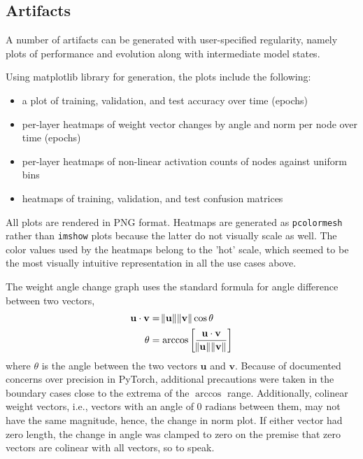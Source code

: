\documentclass[10pt,epsf]{article}
\newcommand{\mxn}[1]{\mathbf{#1}}
\begin{document}
{  \subsection{Artifacts}{
    A number of artifacts can be generated with user-specified regularity, namely plots of performance
    and evolution along with intermediate model states.

    Using matplotlib\autocite{mplpplot} library for generation, the plots include the following:
    \begin{itemize}
    \item{a plot of training, validation, and test accuracy over time (epochs)}
    \item{per-layer heatmaps of weight vector changes by angle and norm per node over time (epochs)}
    \item{per-layer heatmaps of non-linear activation counts of nodes against uniform bins}
    \item{heatmaps of training, validation, and test confusion matrices}
    \end{itemize}

    All plots are rendered in PNG format. Heatmaps are generated as \texttt{pcolormesh}\autocite{mplppcolormesh}
    rather than \texttt{imshow}\autocite{mplpimshow} plots because the latter do not visually scale as well.
    The color values used by the heatmaps belong to the 'hot' scale\autocite{mplpcolorbar}, which seemed to be the most visually intuitive representation in all the use cases above.

    The weight angle change graph uses the standard formula for angle difference between two vectors\autocite[335]{Lay},
    \begin{align*}
      \mxn{u} \cdot \mxn{v} &= \norm{\mxn{u}} \norm{\mxn{v}} \cos \theta \\
      \theta &= \arccos \bigg[ \frac{\mxn{u} \cdot \mxn{v}}{ \norm{\mxn{u}} \norm{\mxn{v}} } \bigg]
    \end{align*}
    where $\theta$ is the angle between the two vectors $\mxn{u}$ and $\mxn{v}$. Because of documented
    concerns over precision in PyTorch\autocite{torchbug8069}, additional precautions were taken in
    the boundary cases close to the extrema of the $\arccos$ range. Additionally, colinear weight vectors,
    i.e., vectors with an angle of 0 radians between them, may not have the same magnitude, hence, the
    change in norm plot. If either vector had zero length, the change in angle was clamped to zero on
    the premise that zero vectors are colinear with all vectors, so to speak.

}}
\end{document}

